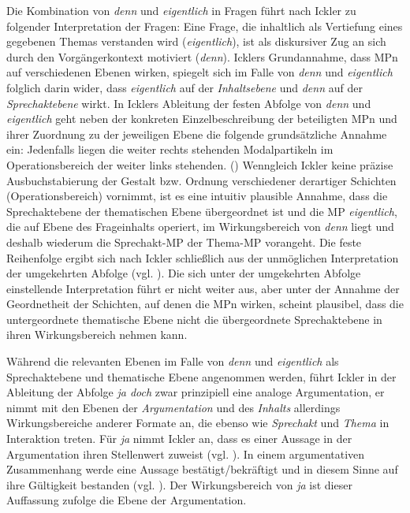 Die Kombination von \textit{denn} und \textit{eigentlich} in Fragen führt nach Ickler zu folgender Interpretation der Fragen: Eine Frage, die inhaltlich als Vertiefung eines gegebenen Themas verstanden wird (\textit{eigentlich}), ist als diskursiver Zug an sich durch den Vorgängerkontext motiviert (\textit{denn}). Icklers Grundannahme, dass MPn auf verschiedenen Ebenen wirken, spiegelt sich im Falle von \textit{denn} und \textit{eigentlich} folglich darin wider, dass \textit{eigentlich} auf der \textit{Inhaltsebene}  und \textit{denn} auf der \textit{Sprech\-aktebene}  wirkt. In Icklers Ableitung der festen Abfolge von \textit{denn} und \textit{eigentlich} geht neben der konkreten Einzelbeschreibung der beteiligten MPn und ihrer Zuordnung zu der jeweiligen Ebene die folgende grundsätzliche Annahme ein: \glqq Jedenfalls liegen die weiter rechts stehenden Modalpartikeln im Operationsbereich der weiter links stehenden.\grqq{} (\citealt[379]{Ickler1994}) Wenngleich Ickler keine präzise Ausbuchstabierung der Gestalt bzw. Ordnung verschiedener derartiger Schichten (\glqq Operationsbereich\grqq{}) vornimmt, ist es eine intuitiv plausible Annahme, dass die Sprechaktebene der thematischen Ebene übergeordnet ist und die MP \textit{eigentlich}, die auf Ebene des Frageinhalts operiert, im Wirkungsbereich von \textit{denn} liegt und deshalb wiederum die Sprechakt-MP der Thema-MP vorangeht. Die feste Reihenfolge ergibt sich nach Ickler schließlich aus der unmöglichen Interpretation der umgekehrten Abfolge (vgl. \citealt[384]{Ickler1994}). Die sich unter der umgekehrten Abfolge einstellende Interpretation führt er nicht weiter aus, aber unter der Annahme der Geordnetheit der Schichten, auf denen die MPn wirken, scheint plausibel, dass die untergeordnete themati\-sche Ebene nicht die übergeordnete Sprechaktebene in ihren Wirkungsbereich nehmen kann. 

Während die relevanten Ebenen im Falle von \textit{denn} und \textit{eigentlich} als Sprech\-aktebene und thematische Ebene angenommen werden, führt Ickler in der Ablei\-tung der Abfolge \textit{ja doch} zwar prinzipiell eine analoge Argumentation, er nimmt mit den Ebenen der \textit{Argumentation}  und des \textit{Inhalts}  allerdings Wirkungsbereiche anderer Formate an, die ebenso wie \textit{Sprechakt}  und \textit{Thema}  in Interaktion treten. Für \textit{ja} nimmt Ickler an, dass es einer Aussage in der Argumentation ihren Stellenwert zuweist (vgl. \citeyear[404]{Ickler1994}). In einem argumentativen Zusammenhang werde eine Aussage bestätigt/bekräftigt und in diesem Sinne auf ihre Gültigkeit bestanden (vgl. \citeyear[399]{Ickler1994}). Der Wirkungsbereich von \textit{ja} ist dieser Auffassung zufolge die Ebene der Argumentation. 
	
